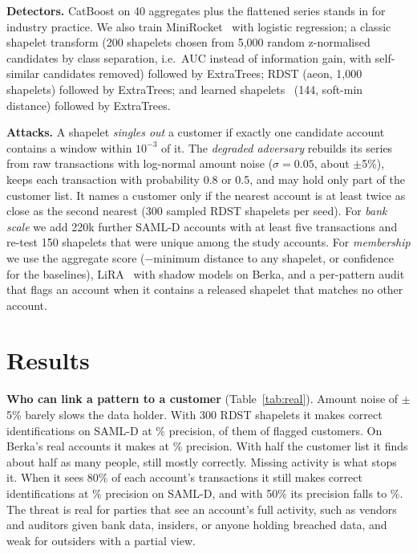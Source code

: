 \documentclass[sigconf,anonymous]{acmart}
\begin{document}
\textbf{Detectors.} CatBoost on 40 aggregates plus the flattened series stands in for industry practice. We also train MiniRocket~\cite{minirocket} with logistic regression; a classic shapelet transform (200 shapelets chosen from 5,000 random z-normalised candidates by class separation, i.e.\ AUC instead of information gain, with self-similar candidates removed) followed by ExtraTrees; RDST (aeon, 1,000 shapelets) followed by ExtraTrees; and learned shapelets~\cite{grabocka2014} (144, soft-min distance) followed by ExtraTrees.

\textbf{Attacks.} A shapelet \emph{singles out} a customer if exactly one candidate account contains a window within $10^{-3}$ of it. The \emph{degraded adversary} rebuilds its series from raw transactions with log-normal amount noise ($\sigma{=}0.05$, about $\pm$5\%), keeps each transaction with probability 0.8 or 0.5, and may hold only part of the customer list. It names a customer only if the nearest account is at least twice as close as the second nearest (300 sampled RDST shapelets per seed). For \emph{bank scale} we add 220k further SAML-D accounts with at least five transactions and re-test 150 shapelets that were unique among the study accounts. For \emph{membership} we use the aggregate score ($-$minimum distance to any shapelet, or confidence for the baselines), LiRA~\cite{carlini2022} with \liraShadows{} shadow models on Berka, and a per-pattern audit that flags an account when it contains a released shapelet that matches no other account.





\section{Results}
\textbf{Who can link a pattern to a customer} (Table~\ref{tab:real}). Amount noise of $\pm$5\% barely slows the data holder. With 300 RDST shapelets it makes \realCust{} correct identifications on SAML-D at \realPrec\% precision, \realSusp{} of them of flagged customers. On Berka's real accounts it makes \berkaRealCust{} at \berkaRealPrec\% precision. With half the customer list it finds about half as many people, still mostly correctly. Missing activity is what stops it. When it sees 80\% of each account's transactions it still makes \realEightyCust{} correct identifications at \realEightyPrec\% precision on SAML-D, and with 50\% its precision falls to \realHalfPrec\%. The threat is real for parties that see an account's full activity, such as vendors and auditors given bank data, insiders, or anyone holding breached data, and weak for outsiders with a partial view.
\end{document}

